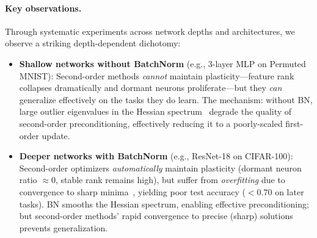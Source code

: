 \documentclass{article}
\begin{document}
\paragraph{Key observations.} Through systematic experiments across network depths and architectures, we observe a striking depth-dependent dichotomy:
\begin{itemize}[leftmargin=*,nosep]
    \item \textbf{Shallow networks without BatchNorm} (e.g., 3-layer MLP on Permuted MNIST): Second-order methods \emph{cannot} maintain plasticity---feature rank collapses dramatically and dormant neurons proliferate---but they \emph{can} generalize effectively on the tasks they do learn. The mechanism: without BN, large outlier eigenvalues in the Hessian spectrum~\citep{ghorbani2019investigation} degrade the quality of second-order preconditioning, effectively reducing it to a poorly-scaled first-order update.
    \item \textbf{Deeper networks with BatchNorm} (e.g., ResNet-18 on CIFAR-100): Second-order optimizers \emph{automatically} maintain plasticity (dormant neuron ratio $\approx 0$, stable rank remains high), but suffer from \emph{overfitting} due to convergence to sharp minima~\citep{shin2025sassha}, yielding poor test accuracy ($< 0.70$ on later tasks). BN smooths the Hessian spectrum, enabling effective preconditioning; but second-order methods' rapid convergence to precise (sharp) solutions prevents generalization.
\end{itemize}
\end{document}
